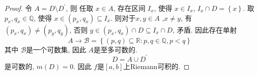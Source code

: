 \documentclass[../main.tex]{subfiles}
\begin{document}
\begin{proof}
   令 \(  A= D\setminus D^{\prime}   \), 则 任取 \(  x \in A  \), 存在区间 \(  I_{x}  \), 使得 \(  x \in I_{x}  \), \(  I_{x}\cap D= \left\{ x \right\}  \). 取 \(  p_{x},q_{x}\in \mathbb{Q}   \), 使得 \(x\in   \left( p_{x},q_{x} \right)\subseteq  I_{x}   \).            则对于\(  x,y\in A  \) ,\(  x\neq y  \), 有\(  \left( p_{x},q_{x} \right)\neq \left( p_{y},q_{y} \right)    \), 否则 \(  y\in \left( p_{x},q_{x} \right)\cap D\subseteq I_{x}\cap D  \), 矛盾. 因此存在单射 \[
   A\to  \mathcal{B}= \left\{ \left( p,q \right)\subseteq \mathbb{R} : p,q\in \mathbb{Q} ,p< q  \right\}
   \]    其中 \(  \mathcal{B}  \)是一个可数集, 因此 \(  A  \)是至多可数的.  \[
   D= A\cup D^{\prime} 
   \]是可数的, \(  m\left( D \right)= 0   \). 因此 \(  f  \)是\(  \left[ a,b \right]   \)上Riemann可积的.     
\end{proof}
\end{document}
